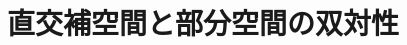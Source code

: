 \documentclass[../../topic_linear-algebra]{subfiles}
\begin{document}
\chapter{直交補空間と部分空間の双対性}




\end{document}
